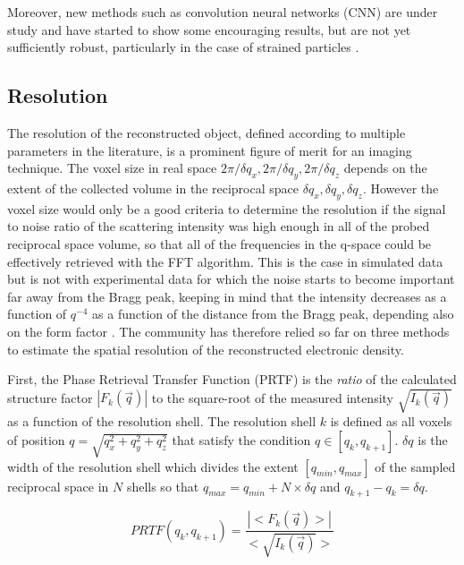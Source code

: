 Moreover, new methods such as convolution neural networks (CNN) are under study and have started to show some encouraging results, but are not yet sufficiently robust, particularly in the case of strained particles \parencite{Cherukara2018, Chan2021, Kim2021a, Wu2021a}.

\subsection{Resolution}

The resolution of the reconstructed object, defined according to multiple parameters in the literature, is a prominent figure of merit for an imaging technique.
The voxel size in real space $2\pi / \delta q_x, 2\pi / \delta q_y, 2\pi / \delta q_z$ depends on the extent of the collected volume in the reciprocal space $\delta q_x, \delta q_y, \delta q_z$.
However the voxel size would only be a good criteria to determine the resolution if the signal to noise ratio of the scattering intensity was high enough in all of the probed reciprocal space volume, so that all of the frequencies in the q-space could be effectively retrieved with the FFT algorithm.
This is the case in simulated data but is not with experimental data for which the noise starts to become important far away from the Bragg peak, keeping in mind that the intensity decreases as a function of $q^{-4}$ \parencite{Marchesini2003a} as a function of the distance from the Bragg peak, depending also on the form factor \parencite{Croset2017}.
The community has therefore relied so far on three methods to estimate the spatial resolution of the reconstructed electronic density.

First, the Phase Retrieval Transfer Function (PRTF) \parencite{Chapman2006} is the \textit{ratio} of the calculated structure factor $|F_k(\vec{q})|$ to the square-root of the measured intensity $\sqrt{I_k(\vec{q})}$ as a function of the resolution shell.
The resolution shell $k$ is defined as all voxels of position $q=\sqrt{q_x^2 + q_y^2 +q_z^2}$ that satisfy the condition $q \in [q_k, q_{k+1}]$.
$\delta q$ is the width of the resolution shell which divides the extent $[q_{min}, q_{max}]$ of the sampled reciprocal space in $N$ shells so that $q_{max} = q_{min} + N \times \delta q$ and $q_{k+1} - q_{k} = \delta q$.

\begin{equation}
    PRTF(q_k, q_{k+1}) = \frac{|<F_k(\vec{q})>|}{<\sqrt{I_k(\vec{q})}>}
\end{equation}


